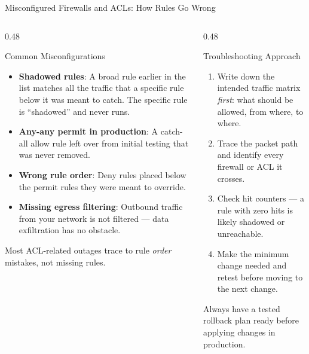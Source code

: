 \documentclass[aspectratio=169]{beamer}  %
\begin{document}
\begin{frame}{Misconfigured Firewalls and ACLs: How Rules Go Wrong}
    \begin{columns}[T]
        \begin{column}{0.48\textwidth}
            \begin{block}{Common Misconfigurations}
                \footnotesize
                \begin{itemize}
                    \item \textbf{Shadowed rules}: A broad rule earlier in the list matches all the traffic that a specific rule below it was meant to catch. The specific rule is ``shadowed'' and never runs.
                    \item \textbf{Any-any permit in production}: A catch-all allow rule left over from initial testing that was never removed.
                    \item \textbf{Wrong rule order}: Deny rules placed below the permit rules they were meant to override.
                    \item \textbf{Missing egress filtering}: Outbound traffic from your network is not filtered --- data exfiltration has no obstacle.
                \end{itemize}
            \end{block}
            \vspace{0.2em}
            \footnotesize
            Most ACL-related outages trace to rule \emph{order} mistakes, not missing rules.
        \end{column}
        \begin{column}{0.48\textwidth}
            \begin{alertblock}{Troubleshooting Approach}
                \footnotesize
                \begin{enumerate}
                    \item Write down the intended traffic matrix \emph{first}: what should be allowed, from where, to where.
                    \item Trace the packet path and identify every firewall or ACL it crosses.
                    \item Check hit counters --- a rule with zero hits is likely shadowed or unreachable.
                    \item Make the minimum change needed and retest before moving to the next change.
                \end{enumerate}
            \end{alertblock}
            \vspace{0.2em}
            \footnotesize
            Always have a tested rollback plan ready before applying changes in production.
        \end{column}
    \end{columns}
\end{frame}
\end{document}
